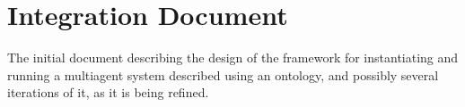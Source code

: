 \chapter{Integration Document}

The initial document describing the design of the framework for instantiating and running a multiagent system described using an ontology, and possibly several iterations of it, as it is being refined.